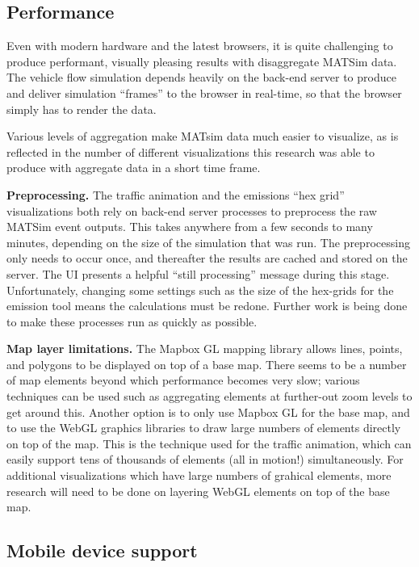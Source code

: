 \hypertarget{performance}{%
\subsection{Performance}\label{performance}}

Even with modern hardware and the latest browsers, it is quite challenging to produce performant, visually pleasing results with disaggregate MATSim data. The vehicle flow simulation depends heavily on the back-end server to produce and deliver simulation ``frames'' to the browser in real-time, so that the browser simply has to render the data.

Various levels of aggregation make MATsim data much easier to visualize, as is reflected in the number of different visualizations this research was able to produce with aggregate data in a short time frame.

\textbf{Preprocessing.} The traffic animation and the emissions ``hex grid'' visualizations both rely on back-end server processes to preprocess the raw MATSim event outputs. This takes anywhere from a few seconds to many minutes, depending on the size of the simulation that was run. The preprocessing only needs to occur once, and thereafter the results are cached and stored on the server. The UI presents a helpful ``still processing'' message during this stage. Unfortunately, changing some settings such as the size of the hex-grids for the emission tool means the calculations must be redone. Further work is being done to make these processes run as quickly as possible.

\textbf{Map layer limitations.} The Mapbox GL mapping library allows lines, points, and polygons to be displayed on top of a base map. There seems to be a number of map elements beyond which performance becomes very slow; various techniques can be used such as aggregating elements at further-out zoom levels to get around this. Another option is to only use Mapbox GL for the base map, and to use the WebGL graphics libraries to draw large numbers of elements directly on top of the map. This is the technique used for the traffic animation, which can easily support tens of thousands of elements (all in motion!) simultaneously. For additional visualizations which have large numbers of grahical elements, more research will need to be done on layering WebGL elements on top of the base map.

\hypertarget{mobile-device-support}{%
\subsection{Mobile device support}\label{mobile-device-support}}


